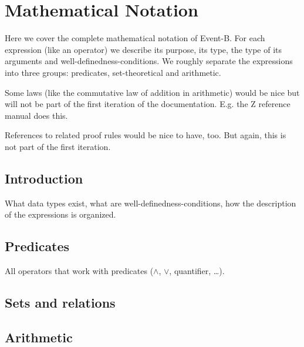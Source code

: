 \section{Mathematical Notation}
\label{reference_03}

Here we cover the complete mathematical notation of Event-B. For each expression (like an operator) we describe its purpose, its type, the type of its arguments and well-definedness-conditions. We roughly separate the expressions into three groups: predicates, set-theoretical and arithmetic.

Some laws (like the commutative law of addition in arithmetic) would be nice but will not be part of the first iteration of the documentation. E.g. the Z reference manual does this.

References to related proof rules would be nice to have, too. But again, this is not part of the first iteration.

\subsection{Introduction}

What data types exist, what are well-definedness-conditions, how the description of the expressions is organized.

\subsection{Predicates}

All operators that work with predicates ($\land$, $\lor$, quantifier, \ldots). 

\subsection{Sets and relations}

\subsection{Arithmetic}

